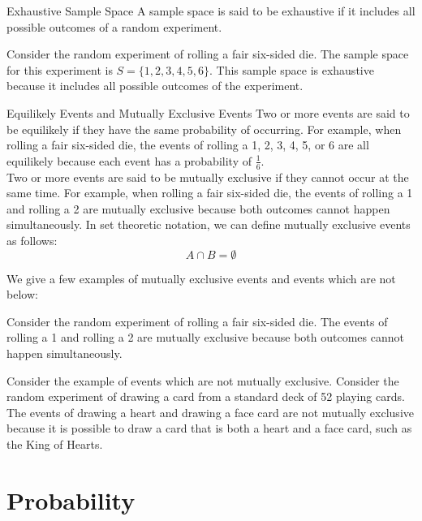 \documentclass[openany]{book}
\begin{document}
\begin{mydefinition}{Exhaustive Sample Space}
A sample space is said to be exhaustive if it includes all possible outcomes of a random experiment.
\end{mydefinition}
\begin{example}
    Consider the random experiment of rolling a fair six-sided die. The sample space for this experiment is $S = \{1, 2, 3, 4, 5, 6\}$. This sample space is exhaustive because it includes all possible outcomes of the experiment.
\end{example}

\begin{mydefinition}{Equilikely Events and Mutually Exclusive Events}
 Two or more events are said to be equilikely if they have the same probability of occurring. For example, when rolling a fair six-sided die, the events of rolling a 1, 2, 3, 4, 5, or 6 are all equilikely because each event has a probability of $\frac{1}{6}$. \\
 Two or more events are said to be mutually exclusive if they cannot occur at the same time. For example, when rolling a fair six-sided die, the events of rolling a 1 and rolling a 2 are mutually exclusive because both outcomes cannot happen simultaneously. In set theoretic notation, we can define mutually exclusive events as follows: \\
$$A \cap B = \emptyset$$
\end{mydefinition}
We give a few examples of mutually exclusive events and events which are not below: \\
\begin{example}
    Consider the random experiment of rolling a fair six-sided die. The events of rolling a 1 and rolling a 2 are mutually exclusive because both outcomes cannot happen simultaneously.
\end{example}

\begin{example}
Consider the example of events which are not mutually exclusive. Consider the random experiment of drawing a card from a standard deck of 52 playing cards. The events of drawing a heart and drawing a face card are not mutually exclusive because it is possible to draw a card that is both a heart and a face card, such as the King of Hearts.
\end{example}

\section{Probability}
\end{document}
